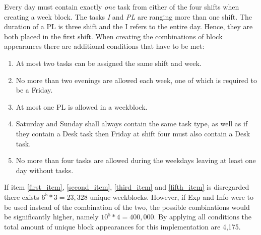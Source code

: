 Every day must contain exactly \textit{one} task from either of the four shifts when creating a week block. The tasks \textit{I} and \textit{PL} are ranging more than one shift. The duration of a PL is three shift and the I refers to the entire day. Hence, they are both placed in the first shift. When creating the combinations of block appearances there are additional conditions that have to be met:
\begin{enumerate}  
\item At most two tasks can be assigned the same shift and week.\label{first_item}
\item No more than two evenings are allowed each week, one of which is required to be a Friday. \label{second_item}
\item At most one PL is allowed in a weekblock. \label{third_item}
\item Saturday and Sunday shall always contain the same task type, as well as if they contain a Desk task then Friday at shift four must also contain a Desk task.\label{fourth_item}
\item No more than four tasks are allowed during the weekdays leaving at least one day without tasks. \label{fifth_item}
\end{enumerate}

If item \ref{first_item}, \ref{second_item}, \ref{third_item} and \ref{fifth_item} is disregarded there exists $6^5*3 = 23,328$ unique weekblocks. However, if Exp and Info were to be used instead of the combination of the two, the possible combinations would be significantly higher, namely $10^5*4 = 400,000$. By applying all conditions the total amount of unique block appearances for this implementation are 4,175.

